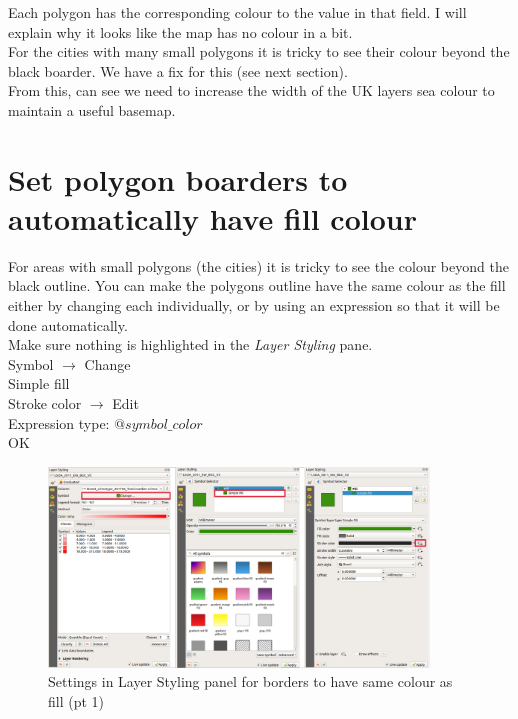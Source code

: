 Each polygon has the corresponding colour to the value in that field. I will explain why it looks like the map has no colour in a bit.\\ 

For the cities with many small polygons it is tricky to see their colour beyond the black boarder. We have a fix for this (see next section).\\

From this, can see we need to increase the width of the UK layers sea colour to maintain a useful basemap.

\null\newpage
\section{Set polygon boarders to automatically have fill colour}

For areas with small polygons (the cities) it is tricky to see the colour beyond the black outline. You can make the polygons outline have the same colour as the fill either by changing each individually, or by using an expression so that it will be done automatically.\\

Make sure nothing is highlighted in the \textit{Layer Styling} pane.\\
Symbol $\rightarrow$ Change\\
Simple fill\\
Stroke color $\rightarrow$ Edit\\
Expression type: $@symbol\_color$\\
OK\\

\begin{figure}[!h]
	\centering
	\includegraphics[width=0.9\textwidth]{images/boarders_area_colour1.png}
	\caption{Settings in Layer Styling panel for borders to have same colour as fill (pt 1)}
	\label{ft_fig_firstfig3}
\end{figure}

